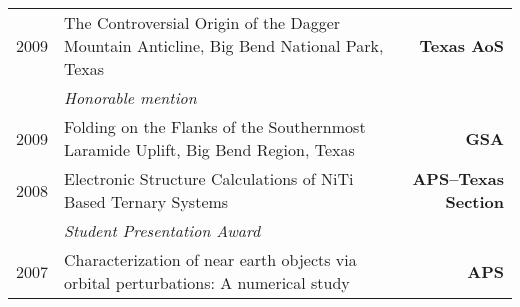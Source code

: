 \documentclass[10pt,letterpaper]{moderncv}
\begin{document}
\begin{tabularx}{\textwidth}{p{.33in}X>{\bfseries}r}
	  2009 & The Controversial Origin of the Dagger Mountain Anticline, Big Bend National Park, Texas &  Texas AoS \\
	  & \emph{Honorable mention} & \\


	  2009 & Folding on the Flanks of the Southernmost Laramide Uplift, Big Bend Region, Texas & GSA \\


	 2008 & Electronic Structure Calculations of NiTi Based Ternary Systems  & APS--Texas Section \\
	 & \emph{Student Presentation Award} & \\

	 2007 & Characterization of near earth objects via orbital perturbations: A numerical study & APS

\end{tabularx}



\end{document}
